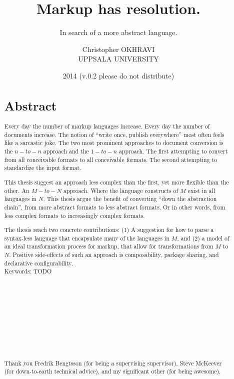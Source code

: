 \documentclass{scrreprt}
\date{2014 \smaller(v.0.2 please do not distribute)}
\title{ Markup has resolution. }
\subtitle{In search of a more abstract language.}
\author{ Christopher OKHRAVI \\ UPPSALA UNIVERSITY }
\begin{document}
\maketitle






%
%
%
%
%
%


\begin{abstract}
\section*{Abstract}
Every day the number of markup languages increase. Every day the number of documents increase. The notion of ``write once, publish everywhere'' most often feels like a sarcastic joke. The two most prominent approaches to document conversion is the $n-to-n$ approach and the $1-to-n$ approach. The first attempting to convert from all conceivable formats to all conceivable formats. The second attempting to standardize the input format.

This thesis suggest an approach less complex than the first, yet more flexible than the other. An $M-to-N$ approach. Where the language constructs of $M$ exist in all languages in $N$. This thesis argue the benefit of converting ``down the abstraction chain'', from more abstract formats to less abstract formats. Or in other words, from less complex formats to increasingly complex formats.

The thesis reach two concrete contributions: (1) A suggestion for how to parse a syntax-less language that encapsulate many of the languages in $M$, and (2) a model of an ideal transformation process for markup, that allow for transformations from $M$ to $N$. Positive side-effects of such an approach is composability, package sharing, and declarative configurability. \\


Keywords: TODO  \\ \\ \\ \\ \\ \\ \\ \\ \\ \\


\smaller
\paragraph{}
\noindent Thank you Fredrik Bengtsson (for being a supervising supervisor), 
Steve McKeever (for down-to-earth technical advice),
and my significant other (for being awesome).
\end{abstract}
\end{document}
